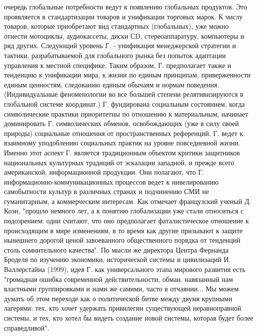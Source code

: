 \documentclass[12pt]{article}
\begin{document}
очередь глобальные потребности ведут к появлению глобальных продуктов. Это проявляется в стандартизации
товаров и унификации торговых марок. К числу товаров, которые приобретают вид стандартных (глобальных),
уже  можно  отнести  мотоциклы,  аудиокассеты,  диски  СD,  стереоаппаратуру,  компьютеры  и  ряд  других.
Следующий уровень Г. - унификация менеджерской стратегии и тактики, разрабатываемой для глобального
рынка без попыток адаптации управления к  местной специфике. Таким  образом, Г.  предполагает также и
тенденцию  к  унификации  мира,  к  жизни  по  единым  принципам,  приверженности  единым  ценностям,
следованию единым обычаям и нормам поведения. (Индивидуальные феноменологии во все большей степени
релятивизируются  в  глобальной  системе  координат.)  Г.  фундирована  социальным  состоянием,  когда
символические  практики  приоритетны  по  отношению  к  материальным,  начинает  доминировать  Г.
символических  обменов,  освобождающих  (уже  в  силу  своей  природы)  социальные  отношения  от
пространственных  референций.  Г.  ведет  к  взаимному  уподоблению  социальных  практик  на  уровне
повседневной  жизни.  Именно  этот  аспект  Г.  является  традиционным  объектом  критики  защитников
национальных культурных традиций от эскалации западной, и прежде всего американской, информационной
продукции.  Они  полагают,  что  Г.  информационно-коммуникационных  процессов  ведет  к  нивелированию
самобытности культур в различных странах и подчинению СМИ не гуманитарным, а коммерческим интересам.
Как  отмечает  французский  ученый  Д.  Коэн,  "прошло  немного  лет,  а  к  понятию  глобализации  уже  стали
относиться с подозрением: одни считают, что оно предполагает фаталистическое отношение к происходящим в
мире  изменениям,  в  то  время  как  другие  призывают  к  защите  нынешнего  дорогой  ценой  завоеванного
общественного порядка от тенденций столь сомнительного качества". По мысли же директора Центра Фернанда
Броделя по изучению экономики, исторической системы и цивилизаций И. Валлерстайна (1999), идея Г. как
универсального  этапа  мирового  развития  есть  "громадная  ошибка  современной  действительности,  обман,
навязанный нам властными группировками и нами же самими, часто в отчаянии... Мы можем думать об этом
переходе как о политической битве между двумя крупными лагерями: тех, кто хочет удержать привилегии
существующей неравноправной системы, и тех, кто хотел бы видеть создание новой системы, которая будет
более справедливой". 
\end{document}
